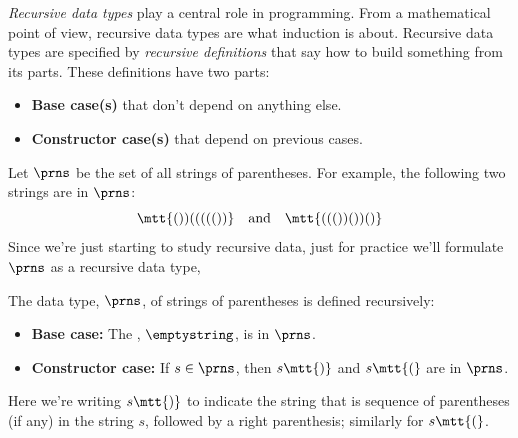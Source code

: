 \label{recursive-data-chapter}

\emph{Recursive data types} play a central role in programming.  From a
mathematical point of view, recursive data types are what induction is
about.  Recursive data types are specified by \emph{recursive definitions}
that say how to build something from its parts.  These definitions have
two parts:
\begin{itemize}
\item \textbf{Base case(s)} that don't depend on anything else.
\item \textbf{Constructor case(s)} that depend on previous cases.
\end{itemize}


Let $\prns$ be the set of all strings of parentheses.  For example,
the following two strings are in $\prns$:
\begin{equation}\label{2strings}
\mtt{())((((())}\quad \text{and}\quad \mtt{((())())()}
\end{equation}
Since we're just starting to study recursive data, just for practice we'll
formulate $\prns$ as a recursive data type,

\begin{definition}\label{prns-def}
The data type, $\prns$, of strings of parentheses is defined recursively:

\begin{itemize}

\item \textbf{Base case:} The , $\emptystring$, is in
  $\prns$.

\item \textbf{Constructor case:} If $s \in \prns$, then
$s\mtt{)}$ and $s\mtt{(}$ are in $\prns$.

\end{itemize}

\end{definition}

Here we're writing $s\mtt{)}$ to indicate the string that is sequence of
parentheses (if any) in the string $s$, followed by a right parenthesis;
similarly for $s\mtt{(}$.

